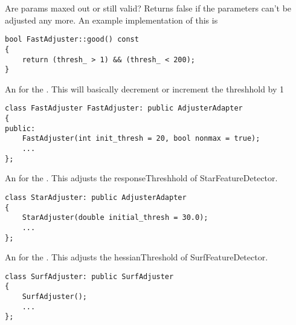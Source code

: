 Are params maxed out or still valid? Returns false if the parameters can't be adjusted any more.
An example implementation of this is
\begin{lstlisting}
bool FastAdjuster::good() const 
{
	return (thresh_ > 1) && (thresh_ < 200);
}
\end{lstlisting}
	  
An  for the . This will basically decrement or increment the
threshhold by 1

\begin{lstlisting}
class FastAdjuster FastAdjuster: public AdjusterAdapter 
{
public:
	FastAdjuster(int init_thresh = 20, bool nonmax = true);
	...
};
\end{lstlisting}

An  for the .  This adjusts the responseThreshhold of 
StarFeatureDetector.
\begin{lstlisting}
class StarAdjuster: public AdjusterAdapter 
{
	StarAdjuster(double initial_thresh = 30.0);
	...
};
\end{lstlisting}


An  for the .  This adjusts the hessianThreshold of 
SurfFeatureDetector.
\begin{lstlisting}
class SurfAdjuster: public SurfAdjuster 
{
	SurfAdjuster();
	...
};
\end{lstlisting}
